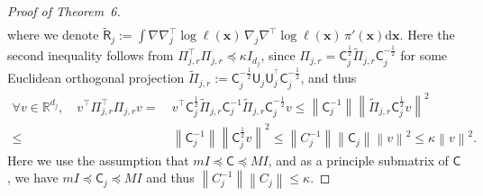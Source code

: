 \documentclass[10pt,a4paper]{amsart}
\newcommand{\bx}{{\boldsymbol{x}}}
\newcommand{\mR}{\mathbb{R}}
\newcommand{\matT}{^{\!\top}}
\newcommand{\mdd}{\mathrm{d}}
\newcommand{\norm}[1]{\left\|#1\right\|}
\newcommand{\sfC}{\mathsf{C}}
\newcommand{\sfR}{\mathsf{R}}
\newcommand{\sfU}{\mathsf{U}}
\begin{document}
\begin{proof}[Proof of Theorem~6]
\begin{equation}
\begin{split}
\end{split}
\end{equation}
where we denote $\widetilde{\sfR}_j := \int \nabla \nabla_j\matT \log \ell(\bx)\, \nabla_j \nabla\matT \log \ell(\bx)\, \pi'(\bx) \mdd \bx$. 
Here the second inequality follows from $\Pi_{j,r}\matT \Pi_{j,r}\preceq \kappa I_{d_j}$, since $\Pi_{j,r} = \sfC_{j}^{\frac{1}{2}} \widetilde{\Pi}_{j,r} \sfC_{j}^{-\frac{1}{2}} $ for some Euclidean orthogonal projection $\widetilde{\Pi}_{j,r} := \sfC_j^{-\frac{1}{2}} \sfU_j^{} \sfU_j^{\matT} \sfC_j^{-\frac{1}{2}} $, and thus
\begin{align*}
    \forall v \in \mR^{d_j},\quad v\matT \Pi_{j,r}\matT \Pi_{j,r} v =~& v\matT \sfC_{j}^{\frac{1}{2}} \widetilde{\Pi}_{j,r} \sfC_j^{-1} \widetilde{\Pi}_{j,r} \sfC_{j}^{-\frac{1}{2}} v \le \norm{\sfC_j^{-1}} \norm{ \widetilde{\Pi}_{j,r} \sfC_{j}^{\frac{1}{2}} v }^2 \\
    \le~& \norm{ \sfC_j^{-1}} \norm{ \sfC_{j}^{\frac{1}{2}} v }^2 \le \norm{C_j^{-1}} \norm{ \sfC_{j} } \norm{ v }^2 \le \kappa \norm{v}^2.
\end{align*}
Here we use the assumption that $m I \preceq \sfC \preceq M I$, and as a principle submatrix of $\sfC$, we have $m I \preceq \sfC_j \preceq M I$ and thus $\norm{C_j^{-1}} \norm{ C_{j} } \le \kappa$.



\end{proof}
\end{document}
